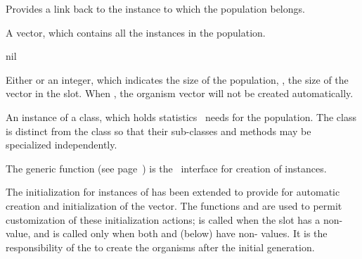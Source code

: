 \gap

\filbreak

{\samepage
{}


Provides a link back to the  instance to which the population belongs.
\par}%

\filbreak

{\samepage
{}

A vector, which contains all the  instances in the population.
\par}%

\filbreak

{\samepage
{} {nil}

Either  or an integer, which indicates the size of the population, \ie,
the size of the vector in the  slot. When , the
organism vector will not be created automatically. \par}%

\filbreak

{\samepage
{}

An instance of a  class, which holds statistics
\geco\ needs for the population. The  class is
distinct from the class so that their sub-classes and methods may 
be specialized independently. 
\par}%

\gap
\filbreak

{\samepage


The generic function  (see page~\pageref{method:make-population})
is the \geco\ interface for creation of  instances.

The initialization for instances of  has been extended to
provide for automatic creation and initialization of the 
vector. The functions  and
 are used to permit customization of these
initialization actions;  is called when the
 slot has a non- value, and  is
called only when both  and  (below) have
non- values. It is the responsibility of the  to
create the organisms after the initial generation.
\par}%

